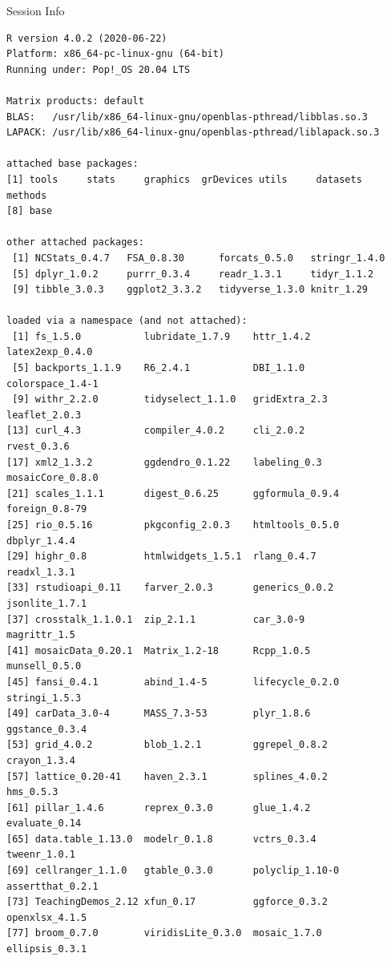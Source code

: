 \documentclass[10pt,handout]{beamer}\usepackage[]{graphicx}\usepackage[]{color}
\makeatletter
\newenvironment{kframe}{%
 \def\at@end@of@kframe{}%
 \ifinner\ifhmode%
  \def\at@end@of@kframe{\end{minipage}}%
  \begin{minipage}{\columnwidth}%
 \fi\fi%
 \def\FrameCommand##1{\hskip\@totalleftmargin \hskip-\fboxsep
 \colorbox{shadecolor}{##1}\hskip-\fboxsep
     \hskip-\linewidth \hskip-\@totalleftmargin \hskip\columnwidth}%
 \MakeFramed {\advance\hsize-\width
   \@totalleftmargin\z@ \linewidth\hsize
   \@setminipage}}%
 {\par\unskip\endMakeFramed%
 \at@end@of@kframe}
\newenvironment{knitrout}{}{} %
\makeatother
\begin{document}


\begin{frame}[fragile]{Session Info}
	\tiny
	
\begin{knitrout}\tiny
{}\color{fgcolor}\begin{kframe}
\begin{verbatim}
R version 4.0.2 (2020-06-22)
Platform: x86_64-pc-linux-gnu (64-bit)
Running under: Pop!_OS 20.04 LTS

Matrix products: default
BLAS:   /usr/lib/x86_64-linux-gnu/openblas-pthread/libblas.so.3
LAPACK: /usr/lib/x86_64-linux-gnu/openblas-pthread/liblapack.so.3

attached base packages:
[1] tools     stats     graphics  grDevices utils     datasets  methods  
[8] base     

other attached packages:
 [1] NCStats_0.4.7   FSA_0.8.30      forcats_0.5.0   stringr_1.4.0  
 [5] dplyr_1.0.2     purrr_0.3.4     readr_1.3.1     tidyr_1.1.2    
 [9] tibble_3.0.3    ggplot2_3.3.2   tidyverse_1.3.0 knitr_1.29     

loaded via a namespace (and not attached):
 [1] fs_1.5.0           lubridate_1.7.9    httr_1.4.2         latex2exp_0.4.0   
 [5] backports_1.1.9    R6_2.4.1           DBI_1.1.0          colorspace_1.4-1  
 [9] withr_2.2.0        tidyselect_1.1.0   gridExtra_2.3      leaflet_2.0.3     
[13] curl_4.3           compiler_4.0.2     cli_2.0.2          rvest_0.3.6       
[17] xml2_1.3.2         ggdendro_0.1.22    labeling_0.3       mosaicCore_0.8.0  
[21] scales_1.1.1       digest_0.6.25      ggformula_0.9.4    foreign_0.8-79    
[25] rio_0.5.16         pkgconfig_2.0.3    htmltools_0.5.0    dbplyr_1.4.4      
[29] highr_0.8          htmlwidgets_1.5.1  rlang_0.4.7        readxl_1.3.1      
[33] rstudioapi_0.11    farver_2.0.3       generics_0.0.2     jsonlite_1.7.1    
[37] crosstalk_1.1.0.1  zip_2.1.1          car_3.0-9          magrittr_1.5      
[41] mosaicData_0.20.1  Matrix_1.2-18      Rcpp_1.0.5         munsell_0.5.0     
[45] fansi_0.4.1        abind_1.4-5        lifecycle_0.2.0    stringi_1.5.3     
[49] carData_3.0-4      MASS_7.3-53        plyr_1.8.6         ggstance_0.3.4    
[53] grid_4.0.2         blob_1.2.1         ggrepel_0.8.2      crayon_1.3.4      
[57] lattice_0.20-41    haven_2.3.1        splines_4.0.2      hms_0.5.3         
[61] pillar_1.4.6       reprex_0.3.0       glue_1.4.2         evaluate_0.14     
[65] data.table_1.13.0  modelr_0.1.8       vctrs_0.3.4        tweenr_1.0.1      
[69] cellranger_1.1.0   gtable_0.3.0       polyclip_1.10-0    assertthat_0.2.1  
[73] TeachingDemos_2.12 xfun_0.17          ggforce_0.3.2      openxlsx_4.1.5    
[77] broom_0.7.0        viridisLite_0.3.0  mosaic_1.7.0       ellipsis_0.3.1    
\end{verbatim}
\end{kframe}
\end{knitrout}
	
\end{frame}
\end{document}
